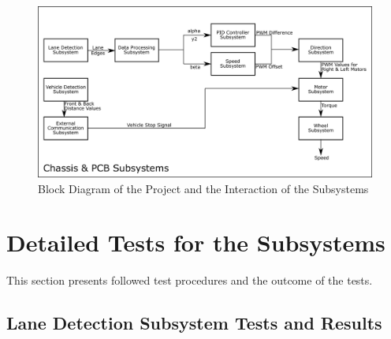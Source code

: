 \documentclass[a4paper,12pt]{article}
\begin{document}

	\begin{figure}[h]
		\includegraphics[width=\textwidth,center]{images/subsys_block}
		\caption{Block Diagram of the Project and the Interaction of the Subsystems}\label{fig:subsys-block}
	\end{figure}







\section{Detailed Tests for the Subsystems}\label{test_sec}
This section presents followed test procedures and the outcome of the tests.

\subsection {Lane Detection Subsystem Tests and Results}	
\end{document}
